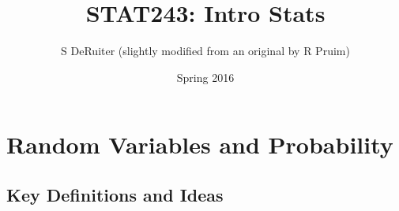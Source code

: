 \documentclass[twoside]{book}\usepackage[]{graphicx}\usepackage[]{xcolor}
\title{STAT243: Intro Stats}
\author{S DeRuiter (slightly modified from an original by R Pruim)}
\date{Spring 2016}
\def\Chapter#1{%
\chapter{#1}
}
\begin{document}
\maketitle

\let\savecleardoublepage\cleardoublepage
\let\cleardoublepage\clearpage 

\setcounter{tocdepth}{1}
\tableofcontents

\let\cleardoublepage\savecleardoublepage





\Chapter{Random Variables and Probability}

\section{Key Definitions and Ideas}
\end{document}
